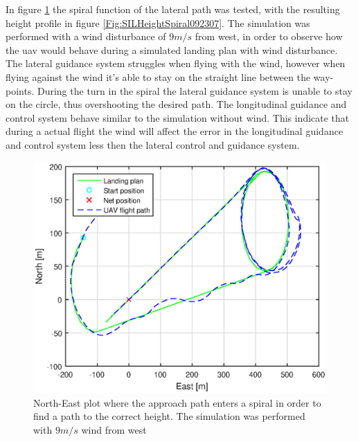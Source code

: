 In figure \ref{Fig:SILNorthEastSpiral092307} the spiral function of the lateral path was tested, with the resulting height profile in figure \ref{Fig:SILHeightSpiral092307}. The simulation was performed with a wind disturbance of $9 m/s$ from west, in order to observe how the \gls{uav} would behave during a simulated landing plan with wind disturbance. The lateral guidance system struggles when flying with the wind, however when flying against the wind it's able to stay on the straight line between the way-points. During the turn in the spiral the lateral guidance system is unable to stay on the circle, thus overshooting the desired path. The longitudinal guidance and control system behave similar to the simulation without wind. This indicate that during a actual flight the wind will affect the error in the longitudinal guidance and control system less then the lateral control and guidance system. 
\begin{figure}[H]
\centering
\includegraphics[scale=0.7]{figs/SysPlot/SILNorthEast6juni092307.eps}
\caption{North-East plot where the approach path enters a spiral in order to find a path to the correct height. The simulation was performed with $9 m/s$ wind from west}
\label{Fig:SILNorthEastSpiral092307}
\end{figure}
